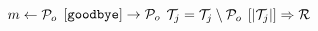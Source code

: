 \documentclass{article}
\begin{document}
\pagestyle{empty}

\newcommand{\send}{\Rightarrow}
\newcommand{\sendto}{\rightarrow}
\newcommand{\recv}{\Leftarrow}
\algrenewcommand{}

\begin{algorithmic}

  \State $m \gets {\cal P}_o$
  \State $[\mathtt{goodbye}] \sendto {\cal P}_o$
  \State ${\cal T}_j={\cal T}_j \setminus {\cal P}_o$
  \EndIf
  \State $[|{\cal T}_j|] \send {\cal R}$
  \EndWhile
  \EndProcedure
  
\end{algorithmic}
\end{document}

